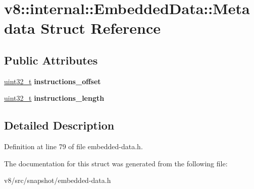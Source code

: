 \hypertarget{structv8_1_1internal_1_1EmbeddedData_1_1Metadata}{}\section{v8\+:\+:internal\+:\+:Embedded\+Data\+:\+:Metadata Struct Reference}
\label{structv8_1_1internal_1_1EmbeddedData_1_1Metadata}
\subsection*{Public Attributes}
\begin{DoxyCompactItemize}
\item 
\mbox{\label{structv8_1_1internal_1_1EmbeddedData_1_1Metadata_a94e68213aad4c1979ffe47f0c38b15e1}} 
\mbox{\hyperlink{classuint32__t}{uint32\+\_\+t}} {\bfseries instructions\+\_\+offset}
\item 
\mbox{\label{structv8_1_1internal_1_1EmbeddedData_1_1Metadata_a41889685a51c3fa6227215d03f6f7cb6}} 
\mbox{\hyperlink{classuint32__t}{uint32\+\_\+t}} {\bfseries instructions\+\_\+length}
\end{DoxyCompactItemize}


\subsection{Detailed Description}


Definition at line 79 of file embedded-\/data.\+h.



The documentation for this struct was generated from the following file\+:\begin{DoxyCompactItemize}
\item 
v8/src/snapshot/embedded-\/data.\+h\end{DoxyCompactItemize}
